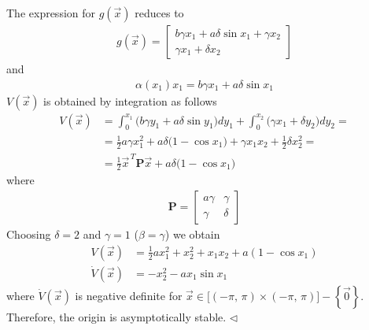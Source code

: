 \documentclass[12pt,a4paper,oneside]{book}
\begin{document}
\begin{onehalfspace}
\begin{example}
	The expression for $g(\vec{x})$ reduces to
	\begin{equation*}
		\begin{aligned}
			g(\vec{x}) = \begin{bmatrix}
				b\gamma x_1+a\delta\sin x_1+\gamma x_2 \\[6pt] \gamma x_1 
				+\delta x_2 \end{bmatrix}
		\end{aligned}
	\end{equation*}
	and
	\begin{equation*}
		\begin{aligned}
			\alpha(x_1)x_1 = b\gamma x_1+a\delta\sin x_1
		\end{aligned}
	\end{equation*}
	$V(\vec{x})$ is obtained by integration as follows
	\begin{equation*}
		\begin{aligned}
			V(\vec{x}) &= \int_{0}^{x_1}\Big(b\gamma y_1+a\delta\sin 
			y_1\Big)dy_1+\int_{0}^{x_2}\Big(\gamma x_1+\delta y_2\Big)dy_2 = 
			\\[8pt]
			&=\frac{1}{2}a\gamma x_1^2+a\delta\big(1-\cos x_1\big)+\gamma 
			x_1x_2+\frac{1}{2}\delta x_2^2 = \\[6pt]
			&= \frac{1}{2}\vec{x}^{\,T}\mathbf{P}\vec{x}+a\delta\big(1-\cos 
			x_1\big)
		\end{aligned}
	\end{equation*}
	where
	\begin{equation*}
		\begin{aligned}
			\mathbf{P}=\begin{bmatrix} a\gamma & \gamma \\[6pt] \gamma & \delta 
			\end{bmatrix}
		\end{aligned}
	\end{equation*}
	Choosing $\delta=2$ and $\gamma = 1$ ($\beta=\gamma$) we obtain
	\begin{equation*}
		\begin{aligned}
			V(\vec{x}) &= \frac{1}{2}ax_1^2+x_2^2+x_1x_2+a(1-\cos x_1) \\[6pt]
			\dot{V}(\vec{x}) &= -x_2^2-ax_1\sin x_1
		\end{aligned}
	\end{equation*}
	where $\dot{V}(\vec{x})$ is negative definite for 
	$\vec{x}\in\Big[(-\pi,\,\pi)\times (-\pi,\,\pi)\Big]-\left\lbrace 
	\vec{0}\right\rbrace $. Therefore, the origin is asymptotically stable.
	$\triangleleft$
\end{example}

\end{onehalfspace}
\end{document}
